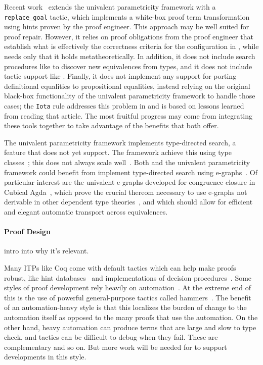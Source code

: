 Recent work~\cite{tabareau2019marriage} extends the univalent parametricity framework with a \lstinline{replace_goal} tactic,
which implements a white-box proof term transformation using hints proven by the proof engineer.
This approach may be well suited for proof repair.
However, it relies on proof obligations from the proof engineer that establish what is effectively the correctness criteria
for the configuration in \toolname, while \toolname needs only that it holds metatheoretically.
In addition, it does not include search procedures like \toolname to discover new equivalences from types,
and it does not include tactic support like \toolname.
Finally, it does not implement any support for porting definitional equalities to propositional equalities,
instead relying on the original black-box functionality of the univalent parametricity framework to handle those cases;
the \lstinline{Iota} rule addresses this problem in \toolname and is based on lessons learned from reading that article.
The most fruitful progress may come from integrating these tools together to take advantage of the benefits that both offer.

The univalent parametricity framework implements type-directed search, a feature that \toolname does not yet support.
The framework achieve this using type classes~\cite{Sozeau2008}; this does not always scale well~\cite{tabareau2019marriage}.
Both \toolname and the univalent parametricity framework could benefit from implement type-directed search using e-graphs~\cite{egraph1}.
Of particular interest are the univalent e-graphs developed for congruence closure in Cubical Agda~\cite{egraph6},
which prove the crucial thereom necessary to use e-graphs not derivable in other dependent type theories~\cite{egraph7},
and which should allow for efficient and elegant automatic transport across equivalences.

\paragraph{Proof Design}

intro into why it's relevant.

Many ITPs like Coq come with default tactics which can
help make proofs robust, like hint databases~\cite{coq-intro} and implementations of decision procedures~\cite{Pugh1991}. 
Some styles of proof development rely heavily on automation~\cite{Chlipala:2013:CPD:2584504}.
At the extreme end of this is the use of powerful general-purpose tactics 
called hammers~\cite{Blanchette2016b, Blanchette2013, Kaliszyk2014, Czajka2018}.
The benefit of an automation-heavy style is that this localizes the burden of change to the automation itself as opposed 
to the many proofs that use the automation.
On the other hand, heavy automation can produce terms that are large and slow to type check,
and tactics can be difficult to debug when they fail.
These are complementary and so on.
But more work will be needed for \toolname to support developments in this style.

